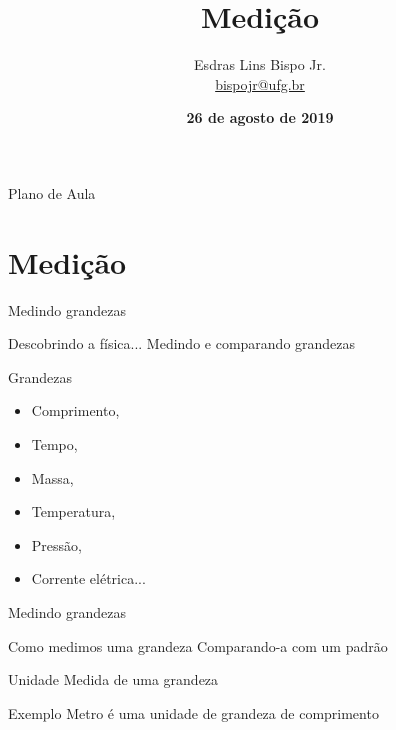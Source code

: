 \documentclass[xcolor=dvipsnames,table]{beamer}
\title{Medição}
\author{
  Esdras Lins Bispo Jr. \\ \url{bispojr@ufg.br}
  }
\institute{
  Física para Ciência da Computação \\Bacharelado em Ciência da Computação}
\date{\textbf{26 de agosto de 2019} }
\begin{document}
	\begin{frame}
		\titlepage
	\end{frame}

	\AtBeginSection{
		\begin{frame}{Sumário}%
    		\tableofcontents[currentsection]
		\end{frame}
	}

	\begin{frame}{Plano de Aula}
		\tableofcontents
	\end{frame}



\section{Medição}
	\begin{frame}{Medindo grandezas}
		\begin{block}{Descobrindo a física...}
			Medindo e comparando grandezas
		\end{block} \pause
		\begin{block}{Grandezas}
			\begin{itemize}
				\item Comprimento, 
				\item Tempo, 
				\item Massa, 
				\item Temperatura, 
				\item Pressão, 
				\item Corrente elétrica...
			\end{itemize}
		\end{block}
	\end{frame}
	
	\begin{frame}{Medindo grandezas}
		\begin{block}{Como medimos uma grandeza}
			Comparando-a com um padrão
		\end{block}	\pause
		\begin{block}{Unidade}
			Medida de uma grandeza
		\end{block} \pause
		\begin{block}{Exemplo}
			Metro é uma unidade de grandeza de comprimento
		\end{block}	
	\end{frame}
	
\end{document}
